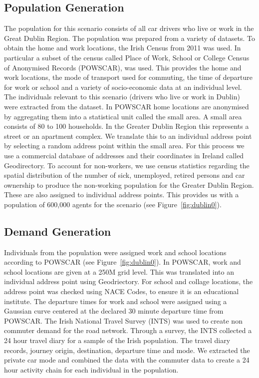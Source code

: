 \subsection{Population Generation}
The population for this scenario consists of all car drivers who live or work in the Great Dublin Region. The population was prepared from a variety of datasets.  To obtain the home and work locations, the Irish Census from 2011 was used. In particular a subset of the census called Place of Work, School or College Census of Anonymised Records (POWSCAR), was used.  This provides the home and work locations, the mode of transport used for commuting, the time of departure for work or school and a variety of socio-economic data at an individual level. The individuals relevant to this scenario (drivers who live or work in Dublin) were extracted from the dataset. In POWSCAR home locations are anonymised by aggregating them into a statistical unit called the small area. A small area consists of 80 to 100 households.  In the Greater Dublin Region this represents a street or an apartment complex.  We translate this to an individual address point by selecting a random address point within the small area.  For this process we use a commercial database of addresses and their coordinates in Ireland called Geodirectory. To account for non-workers, we use census statistics regarding the spatial distribution of the number of sick, unemployed, retired persons and car ownership to produce the non-working population for the Greater Dublin Region.  These are also assigned to individual address points. This provides us with a population of 600,000 agents for the scenario (see Figure~\ref{fig:dublin0}).

\subsection{Demand Generation}
Individuals from the population were assigned work and school locations according to POWSCAR (see Figure~\ref{fig:dublin0}). In POWSCAR, work and school locations are given at a 250M grid level. This was translated into an individual address point using Geodriectory. For school and collage locations, the address point was checked using NACE Codes, to ensure it is an educational institute. The departure times for work  and school were assigned using a Gaussian curve centered at the declared 30 minute departure time from POWSCAR. The Irish National Travel Survey (INTS) was used to create non commuter demand for the road network. Through a survey, the INTS collected a 24 hour travel diary for a sample of the Irish population. The travel diary records, journey origin, destination, departure time and mode. We extracted the private car mode and combined the data with the commuter data to create a 24 hour activity chain for each individual in the population.

